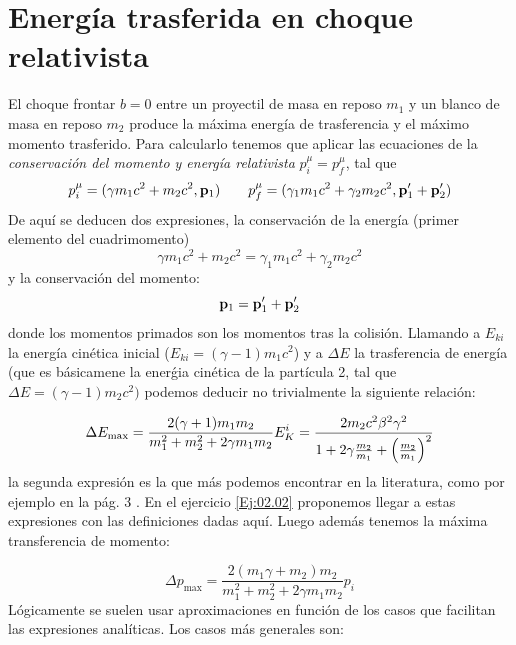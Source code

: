 \section{Energía trasferida en choque relativista}

El choque frontar $b=0$ entre un proyectil de masa en reposo $m_1$ y un blanco de masa en reposo $m_2$ produce la máxima energía de trasferencia y el máximo momento trasferido. Para calcularlo tenemos que aplicar las ecuaciones de la \textit{conservación del momento y energía relativista} $p^{\mu}_i = p^{\mu}_f$, tal que 
\begin{equation}
    p_i^\mu = (\gamma m_1c^2+ m_2c^2, \mathbf{p}_1) \qquad 
    p_f^\mu = (\gamma_1 m_1c^2+ \gamma_2 m_2c^2, \mathbf{p}_1' + \mathbf{p}_2')
\end{equation}
De aquí se deducen dos expresiones, la conservación de la energía (primer elemento del cuadrimomento)
\begin{equation}
    \gamma m_1 c^2 + m_2 c^2 = \gamma_1 m_1 c^2 + \gamma_2 m_2 c^2
\end{equation}
y la conservación del momento: 
\begin{equation}
    \mathbf{p}_1 =  \mathbf{p}_1' + \mathbf{p}_2 '
\end{equation}
donde los momentos primados son los momentos tras la colisión. Llamando a $E_{ki}$ la energía cinética inicial ($E_{ki}=(\gamma-1)m_1c^2$) y a $\Delta E$ la trasferencia de energía (que es básicamene la enerǵia cinética de la partícula 2, tal que $\Delta E = (\gamma-1)m_2 c^2)$ podemos deducir no trivialmente la siguiente relación: 

\begin{equation}
    \Delta E_{\max} = \frac{2(\gamma+1)m_1m_2}{m_1^2 + m_2^2 + 2 \gamma m_1 m_2} E_K^i = \frac{2 m_2 c^2 \beta^2 \gamma^2}{1+ 2 \gamma \frac{m_2}{m_1} + \pqty{\frac{m_2}{m_1} }^2}
\end{equation}
la segunda expresión es la que más podemos encontrar en la literatura, como por ejemplo en la pág. 3 \cite{PDG2020_Passage}. En el ejercicio \ref{Ej:02.02} proponemos llegar a estas expresiones con las definiciones dadas aquí. Luego además tenemos la máxima transferencia de momento: 

\begin{equation}
    \Delta p_{\max} = \frac{2(m_1\gamma+m_2)m_2}{m_1^2 + m_2^2 + 2 \gamma m_1 m_2} p_i 
\end{equation}
Lógicamente se suelen usar aproximaciones en función de los casos que facilitan las expresiones analíticas. Los casos más generales son: 

